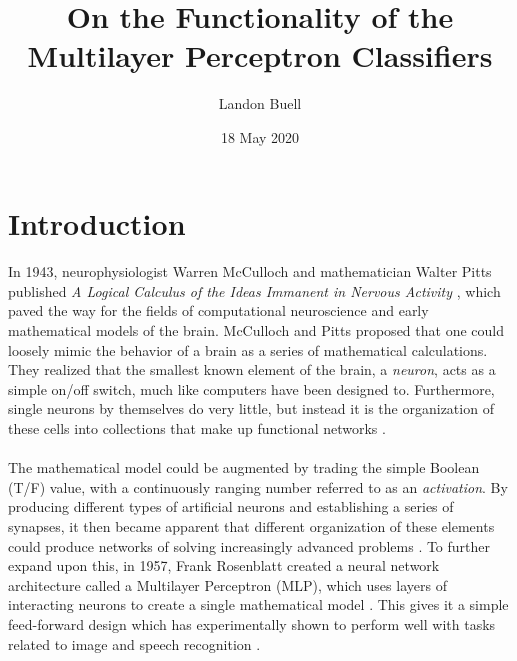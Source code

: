 \documentclass[12pt,letterpaper]{article}
\begin{document}

\title{On the Functionality of the Multilayer Perceptron Classifiers}
\date{18 May 2020}
\author{Landon Buell}
\maketitle


\section*{Introduction}

\paragraph*{}In 1943, neurophysiologist Warren McCulloch and mathematician Walter Pitts published \textit{A Logical Calculus of the Ideas Immanent in Nervous Activity} \cite{McCulloch}, which paved the way for the fields of computational neuroscience and early mathematical models of the brain. McCulloch and Pitts proposed that one could loosely mimic the behavior of a brain as a series of mathematical calculations. They realized that the smallest known element of the brain, a \textit{neuron}, acts as a simple on/off switch, much like computers have been designed to. Furthermore, single neurons by themselves do very little, but instead it is the organization of these cells into collections that make up functional networks \cite{Geron,Levine,McCulloch}. 

\paragraph*{}The mathematical model could be augmented by trading the simple Boolean (T/F) value, with a continuously ranging number referred to as an \textit{activation}. By producing different types of artificial neurons and establishing a series of synapses, it then became apparent that different organization of these elements could produce networks of solving increasingly advanced problems \cite{Goodfellow}. To further expand upon this, in 1957, Frank Rosenblatt created a neural network architecture called a Multilayer Perceptron (MLP), which uses layers of interacting neurons to create a single mathematical model \cite{Geron,Petrik}. This gives it a simple feed-forward design which has experimentally shown to perform well with tasks related to image and speech recognition \cite{Goodfellow,Loy}.
\end{document}
